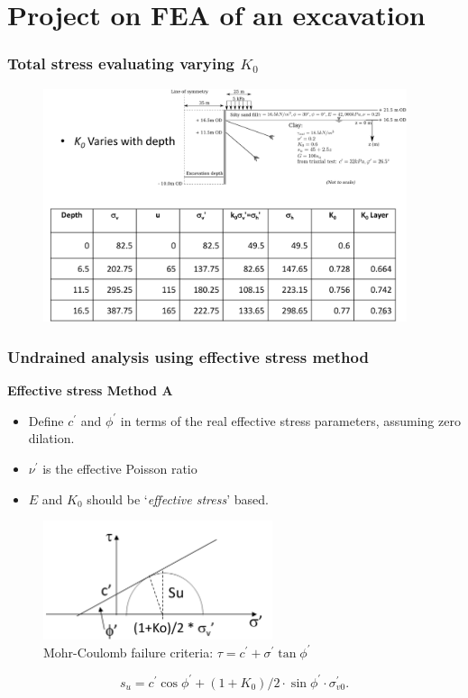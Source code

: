 \documentclass[notes]{beamer}
\begin{document}
\section{Project on FEA of an excavation}
\begin{frame}
\frametitle{Total stress evaluating varying $K_0$}
\begin{figure}
	\includegraphics[width=0.95\textwidth]{figs/excavation-k0.png}
\end{figure}
\end{frame}

\begin{frame}
\frametitle{Undrained analysis using effective stress method}
\textbf{Effective stress Method A}
\begin{itemize}
	\item Define $c^\prime$ and $\phi^\prime$ in terms of the real effective stress parameters, assuming zero dilation.
	\item $\nu^\prime$ is the effective Poisson ratio
	\item $E$ and $K_0$ should be `\textit{effective stress}' based.
\end{itemize}
\begin{figure}
	\includegraphics[width=0.6\textwidth]{figs/su-effective.png}
	\caption*{Mohr-Coulomb failure criteria: $\tau = c^\prime + \sigma^\prime \tan \phi^\prime$}
\end{figure}
	\begin{equation*}
		s_u = c^\prime \cos \phi^\prime + (1+K_0)/2 \cdot \sin \phi^\prime \cdot \sigma_{v0}^\prime.
	\end{equation*}
\end{frame}
\end{document}
